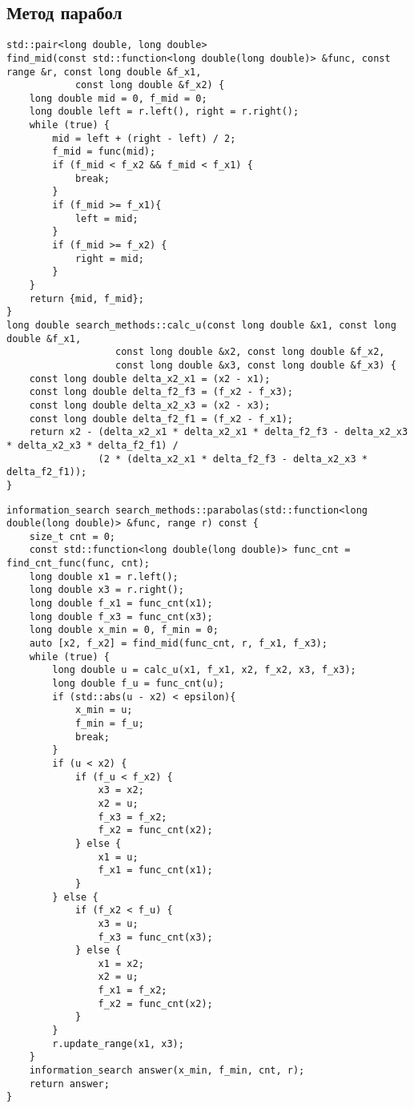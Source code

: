 \newpage
\subsection{Метод парабол} 
\begin{lstlisting}
std::pair<long double, long double>
find_mid(const std::function<long double(long double)> &func, const range &r, const long double &f_x1,
            const long double &f_x2) {
    long double mid = 0, f_mid = 0;
    long double left = r.left(), right = r.right();
    while (true) {
        mid = left + (right - left) / 2;
        f_mid = func(mid);
        if (f_mid < f_x2 && f_mid < f_x1) {
            break;
        }
        if (f_mid >= f_x1){
            left = mid;
        }
        if (f_mid >= f_x2) {
            right = mid;
        }
    }
    return {mid, f_mid};
}    
long double search_methods::calc_u(const long double &x1, const long double &f_x1,
                   const long double &x2, const long double &f_x2,
                   const long double &x3, const long double &f_x3) {
    const long double delta_x2_x1 = (x2 - x1);
    const long double delta_f2_f3 = (f_x2 - f_x3);
    const long double delta_x2_x3 = (x2 - x3);
    const long double delta_f2_f1 = (f_x2 - f_x1);
    return x2 - (delta_x2_x1 * delta_x2_x1 * delta_f2_f3 - delta_x2_x3 * delta_x2_x3 * delta_f2_f1) /
                (2 * (delta_x2_x1 * delta_f2_f3 - delta_x2_x3 * delta_f2_f1));
}
\end{lstlisting}
\newpage
\begin{lstlisting}
information_search search_methods::parabolas(std::function<long double(long double)> &func, range r) const {
    size_t cnt = 0;
    const std::function<long double(long double)> func_cnt = find_cnt_func(func, cnt);
    long double x1 = r.left();
    long double x3 = r.right();
    long double f_x1 = func_cnt(x1);
    long double f_x3 = func_cnt(x3);
    long double x_min = 0, f_min = 0;
    auto [x2, f_x2] = find_mid(func_cnt, r, f_x1, f_x3);
    while (true) {
        long double u = calc_u(x1, f_x1, x2, f_x2, x3, f_x3);
        long double f_u = func_cnt(u);
        if (std::abs(u - x2) < epsilon){
            x_min = u;
            f_min = f_u;
            break;
        }
        if (u < x2) {
            if (f_u < f_x2) {
                x3 = x2;
                x2 = u;
                f_x3 = f_x2;
                f_x2 = func_cnt(x2);
            } else {
                x1 = u;
                f_x1 = func_cnt(x1);
            }
        } else {
            if (f_x2 < f_u) {
                x3 = u;
                f_x3 = func_cnt(x3);
            } else {
                x1 = x2;
                x2 = u;
                f_x1 = f_x2;
                f_x2 = func_cnt(x2);
            }
        }
        r.update_range(x1, x3);
    }
    information_search answer(x_min, f_min, cnt, r);
    return answer;
}
\end{lstlisting}


